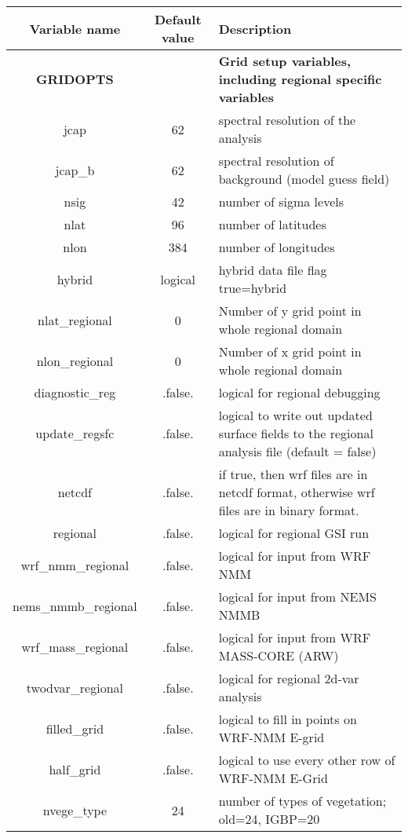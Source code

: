 \begin{table}[h]
 \footnotesize
 \center
 \begin{tabular}{| c | c | p{9cm} |}
 \hline
 Variable name & Default value & Description \\
 \hline
\textbf{GRIDOPTS} &   & \textbf{Grid setup variables, including regional specific variables} \\
 \hline 
 jcap & 62 & spectral resolution of the analysis \\
 \hline
 jcap\_b & 62 & spectral resolution of background (model guess field) \\
 \hline
 nsig & 42 & number of sigma levels \\
 \hline
 nlat & 96 & number of latitudes \\
 \hline
 nlon & 384 & number of longitudes \\
 \hline
 hybrid & logical & hybrid data file flag true=hybrid \\
 \hline
 nlat\_regional & 0 & Number of y grid point in whole regional domain \\
 \hline
 nlon\_regional & 0	& Number of x grid point in whole regional domain \\
 \hline
 diagnostic\_reg & .false. & logical for regional debugging \\
 \hline
 update\_regsfc & .false. & logical to write out updated surface fields to the regional analysis file (default = false) \\
 \hline
 netcdf & .false. & if true, then wrf files are in netcdf format, otherwise wrf files are in binary format. \\
 \hline
 regional & .false. & logical for regional GSI run \\
 \hline
 wrf\_nmm\_regional & .false. & logical for input from WRF NMM \\
 \hline
 nems\_nmmb\_regional & .false. & logical for input from NEMS NMMB \\
 \hline
 wrf\_mass\_regional & .false. & logical for input from WRF MASS-CORE (ARW) \\
 \hline
 twodvar\_regional & .false. & logical for regional 2d-var analysis \\
 \hline
 filled\_grid & .false. & logical to fill in points on WRF-NMM E-grid \\
 \hline
 half\_grid	& .false.& logical to use every other row of WRF-NMM E-Grid \\
 \hline
 nvege\_type & 24 & number of types of vegetation; old=24, IGBP=20 \\

\end{tabular}
\end{table}
